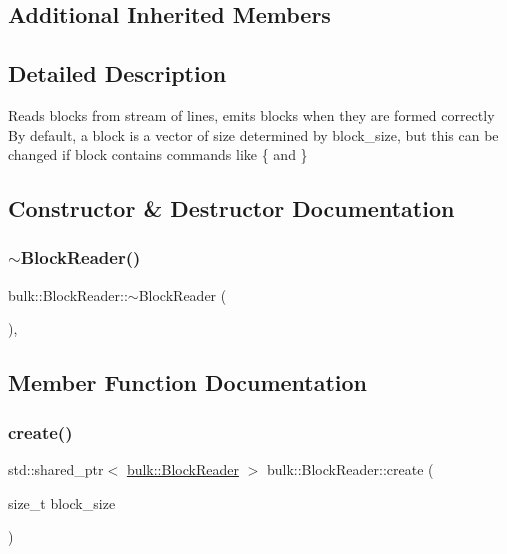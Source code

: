\subsection*{Additional Inherited Members}


\subsection{Detailed Description}
Reads blocks from stream of lines, emits blocks when they are formed correctly By default, a block is a vector of size determined by block\+\_\+size, but this can be changed if block contains commands like \{ and \} 

\subsection{Constructor \& Destructor Documentation}
\mbox{\label{classbulk_1_1BlockReader_a163856bf35ee489d5b2d0cae520fe89e}} 
\subsubsection{\texorpdfstring{$\sim$\+Block\+Reader()}{~BlockReader()}}
{\footnotesize\ttfamily bulk\+::\+Block\+Reader\+::$\sim$\+Block\+Reader (\begin{DoxyParamCaption}{ }\end{DoxyParamCaption})\hspace{0.3cm}{\ttfamily [override]}, {\ttfamily [default]}}



\subsection{Member Function Documentation}
\mbox{\label{classbulk_1_1BlockReader_af0d865e52b8882bf3ad7e2ee7de4c82e}} 
\subsubsection{\texorpdfstring{create()}{create()}}
{\footnotesize\ttfamily std\+::shared\+\_\+ptr$<$ \hyperlink{classbulk_1_1BlockReader}{bulk\+::\+Block\+Reader} $>$ bulk\+::\+Block\+Reader\+::create (\begin{DoxyParamCaption}\item[{size\+\_\+t}]{block\+\_\+size }\end{DoxyParamCaption})\hspace{0.3cm}{\ttfamily [static]}}

